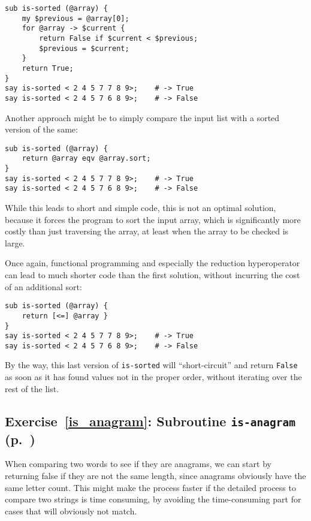 \begin{verbatim}
sub is-sorted (@array) {
    my $previous = @array[0];
    for @array -> $current {
        return False if $current < $previous;
        $previous = $current;
    }
    return True;
}
say is-sorted < 2 4 5 7 7 8 9>;    # -> True
say is-sorted < 2 4 5 7 6 8 9>;    # -> False
\end{verbatim}

Another approach might be to simply compare the input 
list with a sorted version of the same:

\begin{verbatim}
sub is-sorted (@array) {
    return @array eqv @array.sort;
}
say is-sorted < 2 4 5 7 7 8 9>;    # -> True
say is-sorted < 2 4 5 7 6 8 9>;    # -> False
\end{verbatim}

While this leads to short and simple code, this is not 
an optimal solution, because it forces the program to 
sort the input array, which is significantly more costly 
than just traversing the array, at least when the array 
to be checked is large.

Once again, functional programming and especially the 
reduction hyperoperator can lead to much shorter code 
than the first solution, without incurring the cost 
of an additional sort:

\begin{verbatim}
sub is-sorted (@array) {
    return [<=] @array }
}
say is-sorted < 2 4 5 7 7 8 9>;    # -> True
say is-sorted < 2 4 5 7 6 8 9>;    # -> False
\end{verbatim}

By the way, this last version of {\tt is-sorted} will 
``short-circuit'' and return \verb'False' as soon as it has 
found values not in the proper order, without iterating 
over the rest of the list.

\subsection{Exercise~\ref{is_anagram}: Subroutine {\tt is-anagram} (p.~\pageref{is_anagram})}
\label{sol_is_anagram}

When comparing two words to see if they are anagrams, we 
can start by returning false if they are not the same 
length, since anagrams obviously have the same letter 
count. This might make the process faster if the detailed 
process to compare two strings is time consuming, by 
avoiding the time-consuming part for cases that will 
obviously not match.

